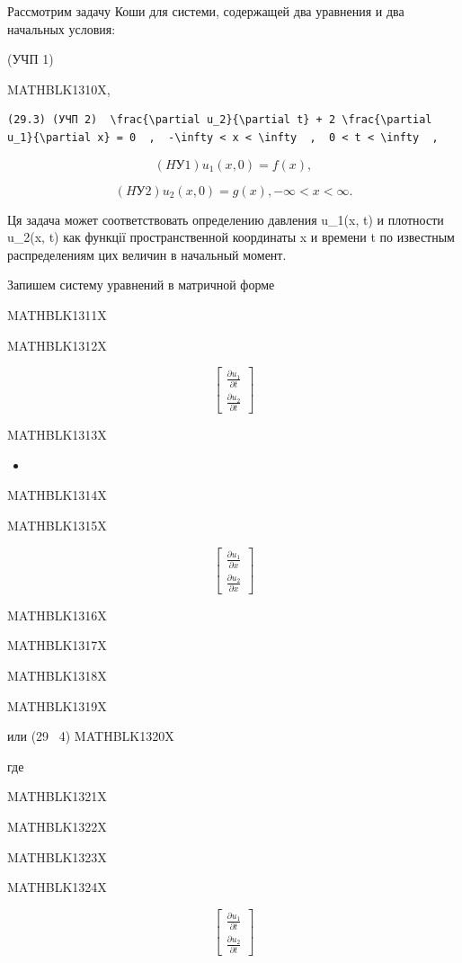 \documentclass[
  ukrainian,
]{article}
\providecommand{\tightlist}{%
  \setlength{\itemsep}{0pt}\setlength{\parskip}{0pt}}
\begin{document}
Рассмотрим задачу Коши для системи, содержащей два уравнения и два
начальных условия:

(УЧП 1)

MATHBLK1310X,

\begin{verbatim}
(29.3) (УЧП 2)  \frac{\partial u_2}{\partial t} + 2 \frac{\partial u_1}{\partial x} = 0  ,  -\infty < x < \infty  ,  0 < t < \infty  ,
\end{verbatim}

\[
(HУ 1)  u_1(x, 0) = f(x)  ,
\]

\[
(HУ 2)  u_2(x, 0) = g(x)  ,  -\infty < x < \infty  .
\]

Ця задача может соответствовать определению давления u\_1(x, t) и
плотности u\_2(x, t) как функції пространственной координаты x и времени
t по известным распределениям цих величин в начальный момент.

Запишем систему уравнений в матричной форме

MATHBLK1311X

MATHBLK1312X

\[
\begin{bmatrix} \frac{\partial u_1}{\partial t} \\ \frac{\partial u_2}{\partial t} \end{bmatrix}
\]

MATHBLK1313X

\begin{itemize}
\tightlist
\item
\end{itemize}

MATHBLK1314X

MATHBLK1315X

\[
\begin{bmatrix} \frac{\partial u_1}{\partial x} \\ \frac{\partial u_2}{\partial x} \end{bmatrix}
\]

MATHBLK1316X

MATHBLK1317X

MATHBLK1318X

MATHBLK1319X

или (29 ~4) MATHBLK1320X

где

MATHBLK1321X

MATHBLK1322X

MATHBLK1323X

MATHBLK1324X

\[
\begin{bmatrix} \frac{\partial u_1}{\partial t} \\ \frac{\partial u_2}{\partial t} \end{bmatrix}
\]
\end{document}
